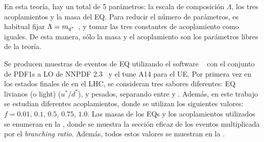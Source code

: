 En esta teoría, hay un total de 5 parámetros: la escala de composición \(\Lambda\), los tres acoplamientos y la masa del \ac{EQ}. Para reducir el número de parámetros, es habitual fijar \(\Lambda = m_{q^*}\)~\cite{Zhan_Li_Liu_Li-2016}, y tomar las tres constantes de acoplamiento como iguales. De esta manera, sólo la masa y el acoplamiento son los parámetros libres de la teoría.

Se producen muestras de eventos de \ac{EQ} utilizando el software ~\cite{Pythia8.2} con el conjunto de \acp{PDF1} a \ac{LO} de NNPDF 2.3~\cite{NNPDF2} y el tune A14 para el \ac{UE}.
Por primera vez en los estados finales de \gammajet en el \ac{LHC}, se consideran tres sabores diferentes: \ac{EQ} livianos (o light) \qstar (\(u^* / d^*\)), y pesados, separando entre \cstar y \bstar. Además, en este trabajo se estudian diferentes acoplamientos, donde se utilizan los siguientes valores: \(f = 0.01, \, 0.1, \, 0.5, \, 0.75, \, 1.0\). Las masas de los \acp{EQ} y los acoplamientos utilizados se enumeran en la \Tab{\ref{tab:samples:samples:sig:qstar:xs}}, donde se muestra la sección eficaz de los eventos multiplicada por el \textit{branching ratio}. Además, todos estos valores se muestran en la \Fig{\ref{tab:samples:samples:sig:qstar:xs}}.



